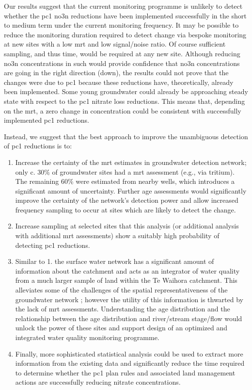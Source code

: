 Our results suggest that the current monitoring programme is unlikely to detect whether the \gls{pc1} \gls{no3n} reductions have been implemented successfully in the short to medium term under the current monitoring frequency.
It may be possible to reduce the monitoring duration required to detect change via bespoke monitoring at new sites with a low \gls{mrt} and low signal/noise ratio.
Of course sufficient sampling, and thus time, would be required at any new site.
Although reducing \gls{no3n} concentrations in such would provide confidence that \gls{no3n} concentrations are going in the right direction (down), the results could not prove that the changes were due to \gls{pc1} because these reductions have, theoretically, already been implemented.
Some young groundwater could already be approaching steady state with respect to the \gls{pc1} nitrate loss reductions.
This means that, depending on the \gls{mrt}, a zero change in concentration could be consistent with successfully implemented \gls{pc1} reductions.

Instead, we suggest that the best approach to improve the unambiguous detection of \gls{pc1} reductions is to:
\begin{enumerate}
    \item Increase the certainty of the \gls{mrt} estimates in groundwater detection network; only c. 30\% of groundwater sites had a \gls{mrt} assessment (e.g., via tritium). The remaining 60\% were estimated from nearby wells, which introduces a significant amount of uncertainty. Further age assessments would significantly improve the certainty of the network's detection power and allow increased frequency sampling to occur at sites which are likely to detect the change.
    \item Increase sampling at selected sites that this analysis (or additional analysis with additional \gls{mrt} assessments) show a suitably high probability of detecting \gls{pc1} reductions.
    \item Similar to 1. the surface water network has a significant amount of information about the catchment and acts as an integrator of water quality from a much larger sample of land within the Te Waihora catchment. This alleviates some of the challenges of the spatial representativeness of the groundwater network \citep{olw_guidance}; however the utility of this information is thwarted by the lack of \gls{mrt} assessments. Understanding the age distribution and the relationship between the age distribution and river/stream stage/flow would unlock the power of these sites and support design of an optimized and integrated water quality monitoring programme.
    \item Finally, more sophisticated statistical analysis could be used to extract more information from the existing data and significantly reduce the time required to determine whether the \gls{pc1} plan rules and associated land management actions are successfully reducing nitrate concentrations.
\end{enumerate}

